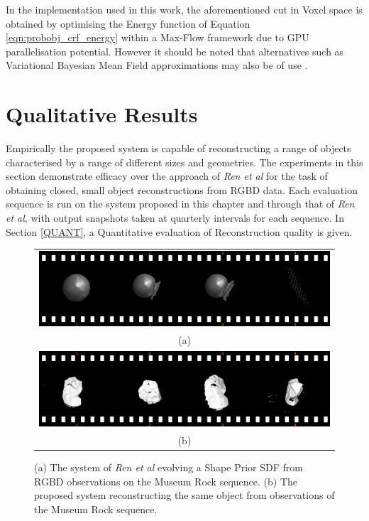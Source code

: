 In the implementation used in this work, the aforementioned cut in Voxel space
is obtained by optimising the Energy function of Equation
\ref{eqn:probobj_crf_energy} within a Max-Flow framework \cite{BOYKOV} due to GPU
parallelisation potential. However it should be noted that alternatives such as
Variational Bayesian Mean Field approximations may also be of use \cite{KRAHENBUHL}.

\section{Qualitative Results}
Empirically the proposed system is capable of reconstructing a range of objects 
characterised by a range of different sizes and geometries. The experiments in 
this section demonstrate efficacy over the approach of \textit{Ren et al} 
\cite{Ren2013} for the task of obtaining closed, small object reconstructions 
from RGBD data. Each evaluation sequence is run on the system proposed in this 
chapter and through that of \textit{Ren et al}, with output snapshots taken at 
quarterly intervals for each sequence. In Section \ref{QUANT}, a Quantitative 
evaluation of Reconstruction quality is given.

\begin{figure}[ht]
  \label{fig:probobj_rock_s3d}
  \centering
  \begin{tabular}{@{}c@{}}
    \includegraphics[width=.6\linewidth]{figures/object_recon/strips/rock_s3d.png} \\
    (a) \\
    \includegraphics[width=.6\linewidth]{figures/object_recon/strips/rock.png} \\ 
    (b)\\
  \end{tabular}
  \caption{(a) The system of \textit{Ren et al} \cite{Ren2013} evolving a Shape Prior SDF 
  from RGBD observations on the Museum Rock sequence. (b) The proposed system reconstructing 
  the same object from observations of the Museum Rock sequence.}
\end{figure}

